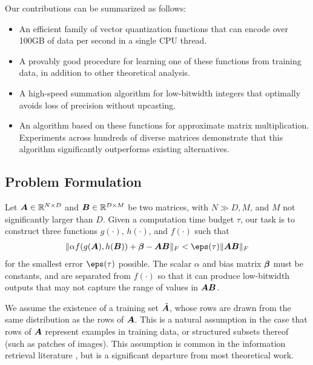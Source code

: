 Our contributions can be summarized as follows:
\begin{itemize}\itemsep0em
    \item An efficient family of vector quantization functions that can encode over 100GB of data per second in a single CPU thread.
    \item A provably good procedure for learning one of these functions from training data, in addition to other theoretical analysis.
    \item A high-speed summation algorithm for low-bitwidth integers that optimally avoids loss of precision without upcasting.
    \item An algorithm based on these functions for approximate matrix multiplication. Experiments across hundreds of diverse matrices demonstrate that this algorithm significantly outperforms existing alternatives.
\end{itemize}

\subsection{Problem Formulation} \label{sec:problemStatement}

Let $\bm{A} \in \mathbb{R}^{N \times D}$ and $\bm{B} \in \mathbb{R}^{D \times M}$ be two matrices, with $N \gg D, M$, and $M$ not significantly larger than $D$. Given a computation time budget $\tau$, our task is to
construct three functions $g(\cdot)$, $h(\cdot)$, and $f(\cdot)$ such that
\begin{align} \label{eq:objective}
    \norm{\alpha f(g(\A), h(\B)) + \mat{\beta} - \A\B}_F < \eps(\tau) \norm{\A\B}_F
\end{align}
for the smallest error $\eps(\tau)$ possible. The scalar $\alpha$ and bias matrix $\bm{\beta}$ must be constants, and are separated from $f(\cdot)$ so that it can produce low-bitwidth outputs that may not capture the range of values in $\bm{A}\bm{B}$. %


We assume the existence of a training set $\tilde{\bm{A}}$, whose rows are drawn from the same distribution as the rows of $\bm{A}$. This is a natural assumption in the case that rows of $\bm{A}$ represent examples in training data, or structured subsets thereof (such as patches of images). This assumption is common in the information retrieval literature \cite{bolt,pairq,quip}, but is a significant departure from most theoretical work.

